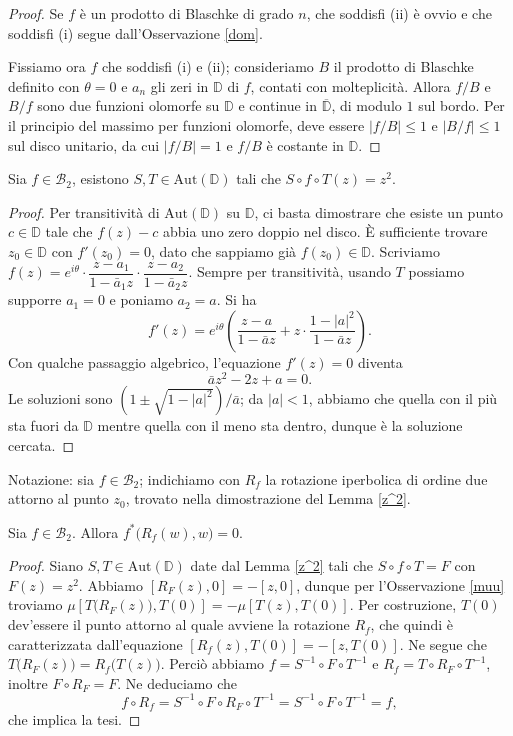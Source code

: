 \begin{proof}
  Se $f$ è un prodotto di Blaschke di grado $n$, che soddisfi (ii) è ovvio e che soddisfi (i) segue dall'Osservazione \ref{dom}.

  Fissiamo ora $f$ che soddisfi (i) e (ii); consideriamo $B$ il prodotto di Blaschke definito con $\theta=0$ e $a_n$ gli zeri in $\mathbb{D}$ di $f$, contati con molteplicità. Allora $f/B$ e $B/f$ sono due funzioni olomorfe su $\mathbb{D}$ e continue in $\overline{\mathbb{D}}$, di modulo $1$ sul bordo. Per il principio del massimo per funzioni olomorfe, deve essere $|f/B| \le 1$ e $|B/f| \le 1$ sul disco unitario, da cui $|f/B|=1$ e $f/B$ è costante in $\mathbb{D}$.
\end{proof}

\begin{lm} \label{z^2}
  Sia $f \in \mathcal{B}_2$, esistono $S, T \in \text{Aut}(\mathbb{D})$ tali che $S\circ f\circ T(z)=z^2$.
\end{lm}

\begin{proof}
  Per transitività di $\text{Aut}(\mathbb{D})$ su $\mathbb{D}$, ci basta dimostrare che esiste un punto $c \in \mathbb{D}$ tale che $f(z)-c$ abbia uno zero doppio nel disco. È sufficiente trovare $z_0 \in \mathbb{D}$ con $f'(z_0)=0$, dato che sappiamo già $f(z_0) \in \mathbb{D}$. Scriviamo $f(z)=e^{i\theta}\cdot\dfrac{z-a_1}{1-\bar{a}_1z}\cdot\dfrac{z-a_2}{1-\bar{a}_2z}$.
  Sempre per transitività, usando $T$ possiamo supporre $a_1=0$ e poniamo $a_2=a$. Si ha
  $$f'(z)=e^{i\theta}\left(\frac{z-a}{1-\bar{a}z}+z\cdot\frac{1-|a|^2}{1-\bar{a}z}\right).$$
  Con qualche passaggio algebrico, l'equazione $f'(z)=0$ diventa
  $$\bar{a}z^2-2z+a=0.$$
  Le soluzioni sono $(1 \pm \sqrt{1-|a|^2})/\bar{a}$; da $|a|<1$, abbiamo che quella con il più sta fuori da $\mathbb{D}$ mentre quella con il meno sta dentro, dunque è la soluzione cercata.
\end{proof}

Notazione: sia $f \in \mathcal{B}_2$; indichiamo con $R_f$ la rotazione iperbolica di ordine due attorno al punto $z_0$, trovato nella dimostrazione del Lemma \ref{z^2}.

\begin{cor} \label{rotazioni}
  Sia $f \in \mathcal{B}_2$. Allora $f^*\bigl(R_f(w),w\bigr)=0$.
\end{cor}

\begin{proof}
  Siano $S, T \in \text{Aut}(\mathbb{D})$ date dal Lemma \ref{z^2} tali che $S\circ f\circ T=F$ con $F(z)=z^2$. Abbiamo $[R_F(z),0]=-[z,0]$, dunque per l'Osservazione \ref{muu} troviamo $\mu[T\bigl(R_F(z)\bigr),T(0)]=-\mu[T(z),T(0)]$.
  Per costruzione, $T(0)$ dev'essere il punto attorno al quale avviene la rotazione $R_f$, che quindi è caratterizzata dall'equazione $[R_f(z),T(0)]=-[z,T(0)]$. Ne segue che $T\bigl(R_F(z)\bigr)=R_f\bigl(T(z)\bigr)$. Perciò abbiamo $f=S^{-1}\circ F\circ T^{-1}$ e $R_f=T\circ R_F\circ T^{-1}$, inoltre $F\circ R_F=F$. Ne deduciamo che
  $$f\circ R_f=S^{-1}\circ F\circ R_F\circ T^{-1}=S^{-1}\circ F\circ T^{-1}=f,$$
  che implica la tesi.
\end{proof}

